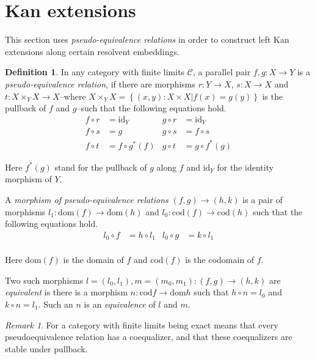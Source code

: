 \documentclass[sort&compress]{elsarticle}
\theoremstyle{plain}
\theoremstyle{definition}
\newtheorem{definition}[theorem]{Definition}
\theoremstyle{remark}
\newtheorem{remark}[theorem]{Remark}
\newcommand\hide[1]{}
\newcommand\key[1]{\emph{#1}\label{#1}}
\newcommand\cat\mathcal
\newcommand\set[1]{\left\{#1\right\}}
\newcommand\of:
\begin{document}
\hide{conclusion... }

\section{Kan extensions}
This section uses \emph{pseudo-equivalence relations} in order to construct left Kan extensions along certain resolvent embeddings.

\newcommand\ri{^*}
\newcommand\id{\mathrm{id}}
\newcommand\dom{\mathrm{dom}}
\newcommand\cod{\mathrm{cod}}
\begin{definition} In any category with finite limits $\cat C$, a parallel pair $f,g\of X\to Y$ is a \key{pseudo-equivalence relation}, if there are morphisms $r:Y\to X$, $s:X\to X$ and $t:X\times_YX \to X$--where $X\times_YX = \set{(x,y)\of X\times X|f(x)=g(y)}$ is the pullback of $f$ and $g$--such that the following equations hold.
\begin{align*}
f\circ r &=\id_Y & g\circ r &= \id_Y\\
f\circ s &= g & g\circ s &= f\circ s\\
f\circ t &= f\circ g\ri(f) & g\circ t &= g\circ f\ri(g)
\end{align*}

Here $f\ri(g)$ stand for the pullback of $g$ along $f$ and $\id_Y$ for the identity morphism of $Y$.

A \emph{morphism of pseudo-equivalence relations} $(f,g) \to (h,k)$ is a pair of morphisms $l_1\of \dom(f) \to \dom(h)$ and $l_0\of \cod(f) \to \cod(h)$ such that the following equations hold.
\begin{align*}
l_0\circ f &= h\circ l_1 & l_0\circ g &= k\circ l_1\\
\end{align*}

Here $\dom(f)$ is the domain of $f$ and $\cod(f)$ is the codomain of $f$.

Two such morphisms $l=(l_0,l_1),m=(m_0,m_1):(f,g) \to (h,k)$ are \emph{equivalent} is there is a morphism $n\of \cod f \to \dom h$ such that $h\circ n = l_0$ and $k\circ n = l_1$. Such an $n$ is an \emph{equivalence} of $l$ and $m$.
\end{definition}

\begin{remark} For a category with finite limits being exact means that every pseudoequivalence relation has a coequalizer, and that these coequalizers are stable under pullback.
\end{remark}
\end{document}
